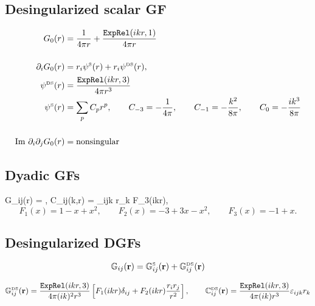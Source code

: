 \documentclass[letterpaper]{article}
\begin{document}
\subsection{Desingularized scalar GF}
\begin{align*}
  G_0(r) &= \frac{1}{4\pi r} + \frac{\texttt{ExpRel}(ikr,1)}{4\pi r}
\\[14pt]
 \partial_i G_0(r) &=
  r_i \psi^{\hbox{\tiny{S}}}(r)
  +
  r_i \psi^{\hbox{\tiny{DS}}}(r),
\\
 \psi^{\hbox{\tiny{DS}}}(r) &= \frac{\texttt{ExpRel}(ikr,3)}{4\pi r^3} 
\\
 \psi^{\hbox{\tiny{S}}}(r) &= \sum_{p} C_p r^p,
 \qquad
 C_{-3}=-\frac{1}{4\pi}, 
 \qquad 
 C_{-1} = -\frac{k^2}{8\pi},
 \qquad
 C_{0}=-\frac{ik^3}{8\pi}
\\[14pt]
\text{Im } \partial_i \partial_j G_0(r)
&=\text{nonsingular}
\end{align*}

\subsection{Dyadic GFs}

{
 \mb G_{ij}(\vb r)
  = 
    ,
\qquad
C_{ij}(k,\vb r) 
  =  \varepsilon_{ijk} r_k F_3(ikr),
}
$$ F_1(x) = 1-x+x^2, 
   \qquad 
   F_2(x) = -3 + 3x - x^2, 
   \qquad 
   F_3(x)=-1+x.
$$

\subsection*{Desingularized DGFs}

$$   \mathbb{G}_{ij}(\mathbf{r})
   = \mathbb{G}_{ij}^{\hbox{\tiny{S}}}(\mathbf{r})
    +\mathbb{G}_{ij}^{\hbox{\tiny{DS}}}(\mathbf{r})
$$

$$ \mathbb{G}^{\hbox{\tiny{DS}}}_{ij}(\mathbf{r})
   =
    \frac{\texttt{ExpRel}(ikr,3)}{4\pi (ik)^2 r^3}
    \left[ F_1(ikr) \delta_{ij} + F_2(ikr) \frac{r_i r_j}{r^2}\right],
  \qquad 
   \mathbb{C}^{\hbox{\tiny{DS}}}_{ij}(\mathbf{r})
   =
    \frac{\texttt{ExpRel}(ikr,3)}{4\pi (ik) r^3} \varepsilon_{ijk}r_k
$$
\end{document}
